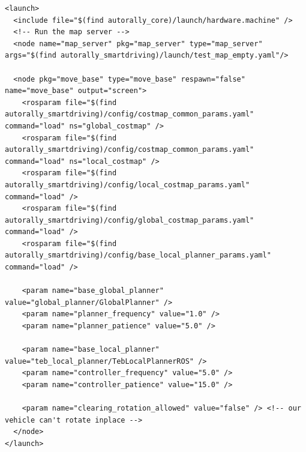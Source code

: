 \documentclass[compsoc,draftclsnofoot,onecolumn,10pt]{IEEEtran}
\begin{document}
\begin{lstlisting}[frame=single,caption={Example launch file}]
<launch>
  <include file="$(find autorally_core)/launch/hardware.machine" />
  <!-- Run the map server -->
  <node name="map_server" pkg="map_server" type="map_server" args="$(find autorally_smartdriving)/launch/test_map_empty.yaml"/>

  <node pkg="move_base" type="move_base" respawn="false" name="move_base" output="screen">
    <rosparam file="$(find autorally_smartdriving)/config/costmap_common_params.yaml" command="load" ns="global_costmap" />
    <rosparam file="$(find autorally_smartdriving)/config/costmap_common_params.yaml" command="load" ns="local_costmap" />
    <rosparam file="$(find autorally_smartdriving)/config/local_costmap_params.yaml" command="load" />
    <rosparam file="$(find autorally_smartdriving)/config/global_costmap_params.yaml" command="load" />
    <rosparam file="$(find autorally_smartdriving)/config/base_local_planner_params.yaml" command="load" />

    <param name="base_global_planner" value="global_planner/GlobalPlanner" />
    <param name="planner_frequency" value="1.0" />
    <param name="planner_patience" value="5.0" />

    <param name="base_local_planner" value="teb_local_planner/TebLocalPlannerROS" />
    <param name="controller_frequency" value="5.0" />
    <param name="controller_patience" value="15.0" />

    <param name="clearing_rotation_allowed" value="false" /> <!-- our vehicle can't rotate inplace -->
  </node>
</launch>
\end{lstlisting}
\end{document}

